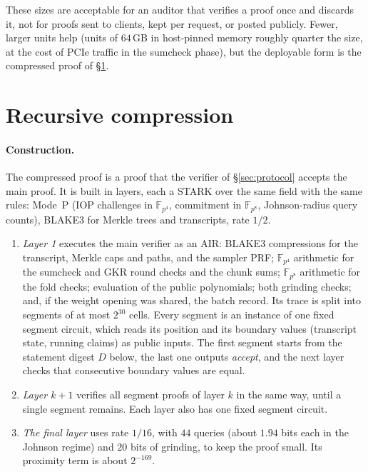 \documentclass[11pt]{article}
\newcommand{\F}{\mathbb{F}}
\newcommand{\Fq}{\F_{p^4}}
\newcommand{\Fo}{\F_{p^8}}
\begin{document}
These sizes are acceptable for an auditor that verifies a proof once and discards it, not for proofs sent to clients, kept per request, or posted publicly.
Fewer, larger units help (units of \(64\)\,GB in host-pinned memory roughly quarter the size, at the cost of PCIe traffic in the sumcheck phase), but the deployable form is the compressed proof of \S\ref{sec:recursion}.

\section{Recursive compression}
\label{sec:recursion}

\paragraph{Construction.}
The compressed proof is a proof that the verifier of \S\ref{sec:protocol} accepts the main proof.
It is built in layers, each a STARK over the same field with the same rules: Mode~P (IOP challenges in \(\Fq\), commitment in \(\Fo\), Johnson-radius query counts), BLAKE3 for Merkle trees and transcripts, rate \(1/2\).
\begin{enumerate}
\item \emph{Layer 1} executes the main verifier as an AIR: BLAKE3 compressions for the transcript, Merkle caps and paths, and the sampler PRF; \(\Fq\) arithmetic for the sumcheck and GKR round checks and the chunk sums; \(\Fo\) arithmetic for the fold checks; evaluation of the public polynomials; both grinding checks; and, if the weight opening was shared, the batch record.
Its trace is split into segments of at most \(2^{30}\) cells.
Every segment is an instance of one fixed segment circuit, which reads its position and its boundary values (transcript state, running claims) as public inputs.
The first segment starts from the statement digest \(D\) below, the last one outputs \emph{accept}, and the next layer checks that consecutive boundary values are equal.
\item \emph{Layer \(k+1\)} verifies all segment proofs of layer \(k\) in the same way, until a single segment remains. Each layer also has one fixed segment circuit.
\item \emph{The final layer} uses rate \(1/16\), with \(44\) queries (about \(1.94\) bits each in the Johnson regime) and \(20\) bits of grinding, to keep the proof small. Its proximity term is about \(2^{-169}\).
\end{enumerate}
\end{document}
